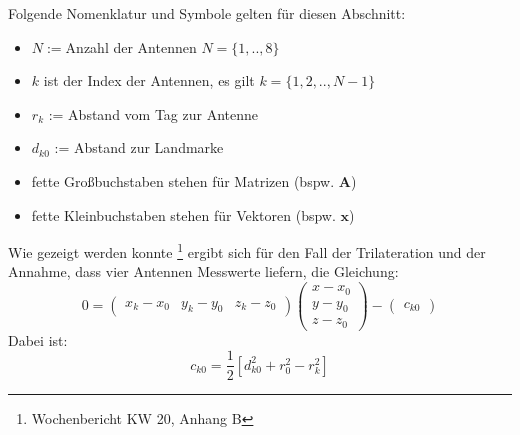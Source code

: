 %		
%		
%
Folgende Nomenklatur und Symbole gelten für diesen Abschnitt:
\begin{itemize}
	\item	$N:=$Anzahl der Antennen $N=\{1,..,8\}$
	\item	$k$ ist der Index der Antennen, es gilt $k = \{1,2,..,N-1\}$
	\item	$r_{k}$ := Abstand vom Tag zur Antenne
	\item	$d_{k0}$ := Abstand zur Landmarke
	\item	fette Großbuchstaben stehen für Matrizen (bspw. $\mathbf{A}$)
	\item	fette Kleinbuchstaben stehen für Vektoren (bspw. $\mathbf{x}$)
\end{itemize}
%
Wie gezeigt werden konnte \footnote{Wochenbericht KW 20, Anhang B} ergibt sich für den Fall der Trilateration und der Annahme, dass vier Antennen Messwerte liefern, die Gleichung:
\begin{equation}\label{eq:final_trilateration_model}
0=
\left(
	\begin{array}{ccc}
		x_k-x_0 & y_k-y_0 & z_k-z_0 
	\end{array}
\right)
\left(
   \begin{array}{c}
	   x-x_0\\
	   y-y_0\\
	   z-z_0
   \end{array}
\right)
-
\left(
	\begin{array}{c}
		c_{k0}
	\end{array}
\right) 
\end{equation}
%
Dabei ist:
\begin{equation}\label{eq:c_k0}
	c_{k0}=\frac{1}{2}[d_{k0}^2+r_{0}^2-r_k^2]
\end{equation}
